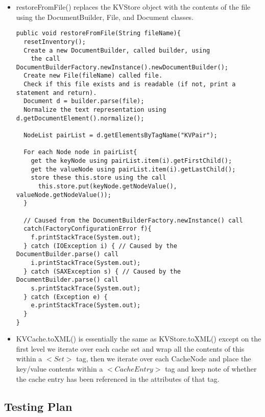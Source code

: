 \documentclass{article}
\begin{document}
\begin{itemize}
\item restoreFromFile() replaces the KVStore object with the contents of the file using the DocumentBuilder, File, and Document classes.
\begin{verbatim}
public void restoreFromFile(String fileName){
  resetInventory();
  Create a new DocumentBuilder, called builder, using 
    the call DocumentBuilderFactory.newInstance().newDocumentBuilder();
  Create new File(fileName) called file.
  Check if this file exists and is readable (if not, print a statement and return).
  Document d = builder.parse(file);
  Normalize the text representation using d.getDocumentElement().normalize();

  NodeList pairList = d.getElementsByTagName("KVPair");

  For each Node node in pairList{
    get the keyNode using pairList.item(i).getFirstChild();
    get the valueNode using pairList.item(i).getLastChild();
    store these this.store using the call 
      this.store.put(keyNode.getNodeValue(), valueNode.getNodeValue());
  }

  // Caused from the DocumentBuilderFactory.newInstance() call
  catch(FactoryConfigurationError f){
    f.printStackTrace(System.out);
  } catch (IOException i) { // Caused by the DocumentBuilder.parse() call
    i.printStackTrace(System.out);
  } catch (SAXException s) { // Caused by the DocumentBuilder.parse() call
    s.printStackTrace(System.out);
  } catch (Exception e) {
    e.printStackTrace(System.out);
  }
}
  \end{verbatim}

\item 
KVCache.toXML() is essentially the same as KVStore.toXML() except on the first level we iterate over each cache set and wrap all the contents of this within a $<Set>$ tag,
then we iterate over each CacheNode and place the key/value contents within a $<CacheEntry>$ tag and keep note of whether the cache entry has been referenced in the attributes
of that tag. 

\end{itemize}

\subsection*{Testing Plan}
\end{document}
